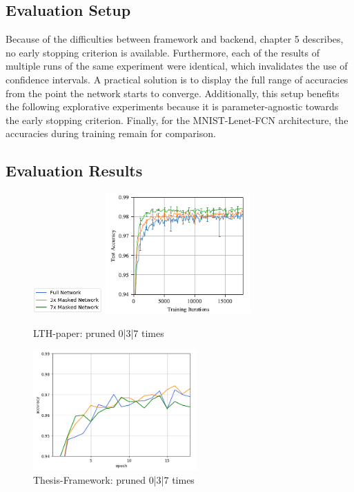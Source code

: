 \subsection*{Evaluation Setup}
Because of the difficulties between framework and backend, chapter 5 describes, no early stopping criterion is available. Furthermore, each of the results of multiple runs of the same experiment were identical, which invalidates the use of confidence intervals. A practical solution is to display the full range of accuracies from the point the network starts to converge. Additionally, this setup benefits the following explorative experiments because it is parameter-agnostic towards the early stopping criterion. Finally, for the MNIST-Lenet-FCN architecture, the accuracies during training remain for comparison.
\subsection*{Evaluation Results}
\begin{figure}
	\begin{minipage}{\textwidth}
		\centering
		\includegraphics[width=100px]{gfx/7-Evaluation/LTH_1_legend.png}
	\end{minipage}
	\begin{minipage}{0.5\textwidth}
		\centering
		\includegraphics[height=175px]{gfx/7-Evaluation/LTH_1.png}
		\caption*{LTH-paper: pruned 0|3|7 times}
		\label{?}
	\end{minipage}\hfill
	\begin{minipage}{0.5\textwidth}
		\centering
		\includegraphics[height=175px]{gfx/Experiments/Reproduction-MNIST-FCN/accuracy/LTH_1.png}
		\caption*{Thesis-Framework: pruned 0|3|7 times}
		\label{?}
	\end{minipage}
\end{figure}

